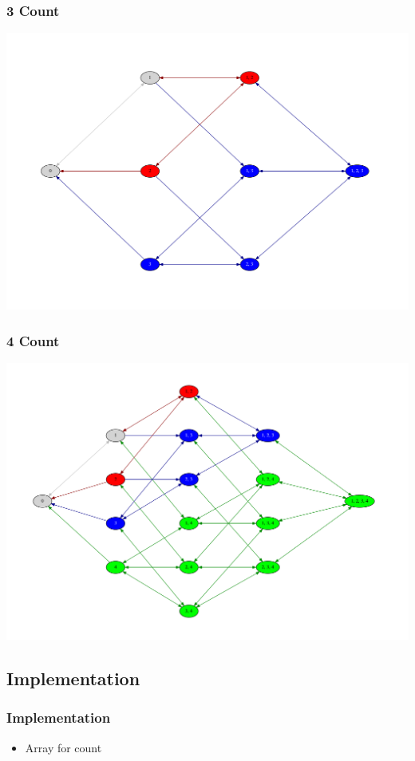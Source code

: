 \documentclass[10pt]{beamer}
\begin{document}
\begin{frame}
  \frametitle{3 Count}
  \centering

  \includegraphics[width=\textwidth]{timed_automata/count3.pdf}
\end{frame}

\begin{frame}
  \frametitle{4 Count}
  \centering

  \includegraphics[width=\textwidth]{timed_automata/count4.pdf}
\end{frame}

\subsection{Implementation}
\begin{frame}
  \frametitle{Implementation}

  \begin{itemize}
    \item Array for count
  \end{itemize}
\end{frame}

{\aauwavesbg
\begin{frame}
\end{frame}}
\end{document}
